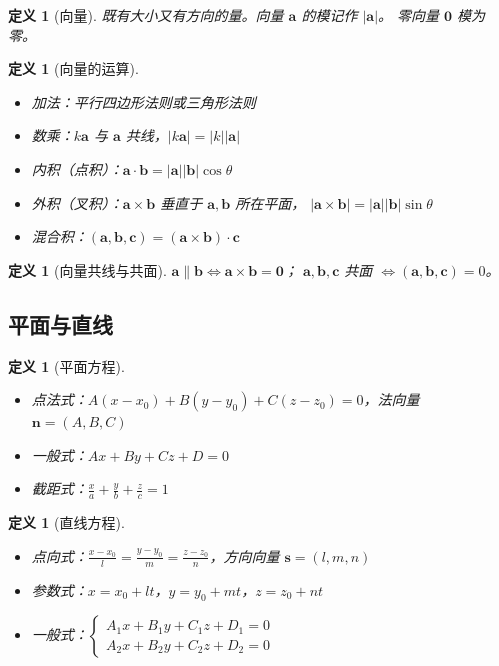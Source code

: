\documentclass[12pt,a4paper]{ctexart}
\newtheorem{definition}[theorem]{定义}
\theoremstyle{remark}
\begin{document}
\begin{definition}[向量]
既有大小又有方向的量。向量 $\mathbf{a}$ 的模记作 $|\mathbf{a}|$。
零向量 $\mathbf{0}$ 模为零。
\end{definition}

\begin{definition}[向量的运算]
\begin{itemize}
  \item 加法：平行四边形法则或三角形法则
  \item 数乘：$k\mathbf{a}$ 与 $\mathbf{a}$ 共线，$|k\mathbf{a}| = |k||\mathbf{a}|$
  \item 内积（点积）：$\mathbf{a} \cdot \mathbf{b} = |\mathbf{a}||\mathbf{b}|\cos\theta$
  \item 外积（叉积）：$\mathbf{a} \times \mathbf{b}$ 垂直于 $\mathbf{a},\mathbf{b}$ 所在平面，
    $|\mathbf{a} \times \mathbf{b}| = |\mathbf{a}||\mathbf{b}|\sin\theta$
  \item 混合积：$(\mathbf{a},\mathbf{b},\mathbf{c}) = (\mathbf{a} \times \mathbf{b}) \cdot \mathbf{c}$
\end{itemize}
\end{definition}

\begin{definition}[向量共线与共面]
$\mathbf{a} \parallel \mathbf{b} \iff \mathbf{a} \times \mathbf{b} = \mathbf{0}$；
$\mathbf{a},\mathbf{b},\mathbf{c}$ 共面 $\iff (\mathbf{a},\mathbf{b},\mathbf{c}) = 0$。
\end{definition}

\subsection{平面与直线}

\begin{definition}[平面方程]
\begin{itemize}
  \item 点法式：$A(x-x_0)+B(y-y_0)+C(z-z_0)=0$，法向量 $\mathbf{n}=(A,B,C)$
  \item 一般式：$Ax+By+Cz+D=0$
  \item 截距式：$\frac{x}{a}+\frac{y}{b}+\frac{z}{c}=1$
\end{itemize}
\end{definition}

\begin{definition}[直线方程]
\begin{itemize}
  \item 点向式：$\frac{x-x_0}{l}=\frac{y-y_0}{m}=\frac{z-z_0}{n}$，方向向量 $\mathbf{s}=(l,m,n)$
  \item 参数式：$x=x_0+lt$，$y=y_0+mt$，$z=z_0+nt$
  \item 一般式：$\begin{cases} A_1x+B_1y+C_1z+D_1=0 \\ A_2x+B_2y+C_2z+D_2=0 \end{cases}$
\end{itemize}
\end{definition}
\end{document}
